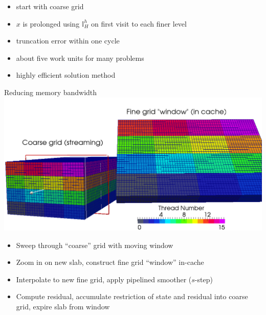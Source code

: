 \documentclass{beamer}
\newcommand{\vx}{\ensuremath{x}}
\begin{document}
\begin{frame}[fragile]
\begin{figure}
\label{fig:FMG}
\end{figure}
\begin{itemize}
  \item start with coarse grid
  \item $\vx$ is prolonged using $\mathbb{I}_H^h$ on first visit to each finer level
  \item truncation error within one cycle
  \item about five work units for many problems
  \item highly efficient solution method
\end{itemize}
\end{frame}






\begin{frame}{Reducing memory bandwidth}
  \includegraphics[width=\textwidth]{figures/MG/SRMGWindow}
  \begin{itemize}
  \item Sweep through ``coarse'' grid with moving window
  \item Zoom in on new slab, construct fine grid ``window'' in-cache
  \item Interpolate to new fine grid, apply pipelined smoother ($s$-step)
  \item Compute residual, accumulate restriction of state and residual into coarse grid, expire slab from window
  \end{itemize}
\end{frame}
\end{document}
